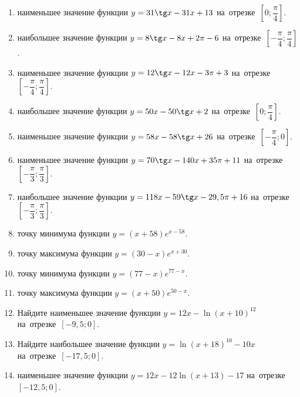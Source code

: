 \documentclass[a4paper,10pt]{article}
\begin{document}
\begin{enumerate}
\item {} наименьшее значение функции $y = 31\tg x-31x+13$ на~отрезке~$\left[0;\dfrac{\pi }{4}\right]$.

\item {} наибольшее значение функции $y=8\tg x-8x+2\pi -6$ на~отрезке~$\left[-\dfrac{\pi }{4};\dfrac{\pi }{4}\right]$.

\item {} наименьшее значение функции $y=12\tg x-12x-3\pi +3$ на~отрезке~$\left[-\dfrac{\pi }{4};\dfrac{\pi }{4}\right]$.

\item {} наибольшее значение функции $y = 50x-50\tg x +2$ на~отрезке~$\left[0;\dfrac{\pi }{4}\right]$.

\item {} наименьшее значение функции $y = 58x-58\tg x +26$ на~отрезке~$\left[-\dfrac{\pi }{4};0\right]$.

\item {} наименьшее значение функции $y = 70\tg x-140x+35 \pi +11$ на~отрезке~$\left[-\dfrac{\pi }{3};\dfrac{\pi }{3}\right]$.

\item {} наибольшее значение функции $y = 118x-59\tg x-29,5\pi +16$ на~отрезке~$\left[-\dfrac{\pi }{3};\dfrac{\pi }{3}\right]$.

\item {} точку минимума функции $y = \left(x+58\right)e^{x-58}$.

\item {} точку максимума функции $y = \left(30-x\right)e^{x+30}$.

\item {} точку минимума функции $y = \left(77-x\right)e^{77-x}$.

\item {} точку максимума функции $y = \left(x+50\right)e^{50-x}$.

\item Найдите наименьшее значение функции $y = 12x-\ln \left(x+10\right)^{12}$ на~отрезке~$\left[-9,5;0\right]$.

\item Найдите наибольшее значение функции $y = \ln \left(x+18\right)^{10}-10x$ на~отрезке~$\left[-17,5;0\right]$.

\item {} наименьшее значение функции $y = 12x-12\ln \left(x+13\right) -17$ на~отрезке~$\left[-12,5;0\right]$.


\end{enumerate}
\end{document}
